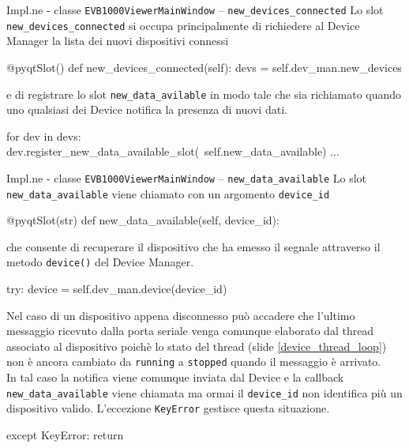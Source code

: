 \begin{frame}[fragile, shrink=10]{Impl.ne - classe \lstinline!EVB1000ViewerMainWindow! -- \lstinline!new_devices_connected!}
  Lo slot \lstinline!new_devices_connected! si occupa principalmente di richiedere al Device
  Manager la lista dei nuovi dispositivi connessi 
  \begin{Python}
    @pyqtSlot()
    def new_devices_connected(self):
        devs = self.dev_man.new_devices
  \end{Python}

  e di registrare lo slot \lstinline!new_data_avilable! in modo tale che sia richiamato
  quando uno qualsiasi dei Device notifica la presenza di nuovi dati.
  \begin{Python}
        for dev in devs:
            dev.register_new_data_available_slot(\
                self.new_data_available)
        ...    
  \end{Python}
\end{frame}


\begin{frame}[fragile, shrink=30]{Impl.ne - classe \lstinline!EVB1000ViewerMainWindow! -- \lstinline!new_data_available!}
  Lo slot \lstinline!new_data_available! viene chiamato con un argomento \lstinline!device_id!
  \begin{Python}
    @pyqtSlot(str)
    def new_data_available(self, device_id):
  \end{Python}

  che consente di recuperare il dispositivo che ha emesso il segnale attraverso il metodo
  \lstinline!device()! del Device Manager.
  \begin{Python}
        try:
            device = self.dev_man.device(device_id)
  \end{Python}

  Nel caso di un dispositivo appena disconnesso può accadere che l'ultimo
  messaggio ricevuto dalla porta seriale venga comunque elaborato dal thread
  associato al dispositivo poichè lo stato del thread (slide \ref{device_thread_loop}) non è ancora
  cambiato da \lstinline!running! a \lstinline!stopped! quando il messaggio è arrivato.\\
  In tal caso la notifica viene comunque inviata dal Device e la callback \lstinline!new_data_available!
  viene chiamata ma ormai il \lstinline!device_id! non identifica più un dispositivo valido.
  L'eccezione \lstinline!KeyError! gestisce questa situazione.
  \begin{Python}
        except KeyError:
            return

  \end{Python}
\end{frame}

